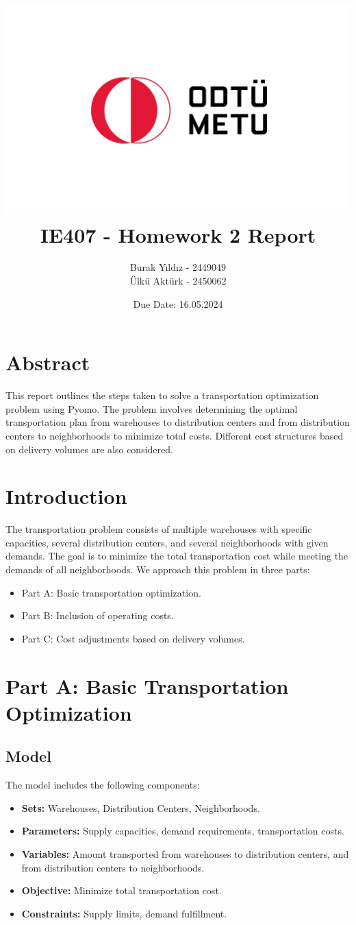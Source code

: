 \documentclass[12pt]{article}
\title{\includegraphics{9.4.png}\\ IE407 - Homework 2 Report}
\author{Burak Yıldız - 2449049 \\ Ülkü Aktürk - 2450062}
\date{Due Date: 16.05.2024}
\begin{document}
\maketitle
\newpage

\section*{Abstract}
This report outlines the steps taken to solve a transportation optimization problem using Pyomo. The problem involves determining the optimal transportation plan from warehouses to distribution centers and from distribution centers to neighborhoods to minimize total costs. Different cost structures based on delivery volumes are also considered.

\section*{Introduction}
The transportation problem consists of multiple warehouses with specific capacities, several distribution centers, and several neighborhoods with given demands. The goal is to minimize the total transportation cost while meeting the demands of all neighborhoods. We approach this problem in three parts:
\begin{itemize}
    \item Part A: Basic transportation optimization.
    \item Part B: Inclusion of operating costs.
    \item Part C: Cost adjustments based on delivery volumes.
\end{itemize}

\section*{Part A: Basic Transportation Optimization}
\subsection*{Model}
The model includes the following components:
\begin{itemize}
    \item \textbf{Sets:} Warehouses, Distribution Centers, Neighborhoods.
    \item \textbf{Parameters:} Supply capacities, demand requirements, transportation costs.
    \item \textbf{Variables:} Amount transported from warehouses to distribution centers, and from distribution centers to neighborhoods.
    \item \textbf{Objective:} Minimize total transportation cost.
    \item \textbf{Constraints:} Supply limits, demand fulfillment.
\end{itemize}
\end{document}
